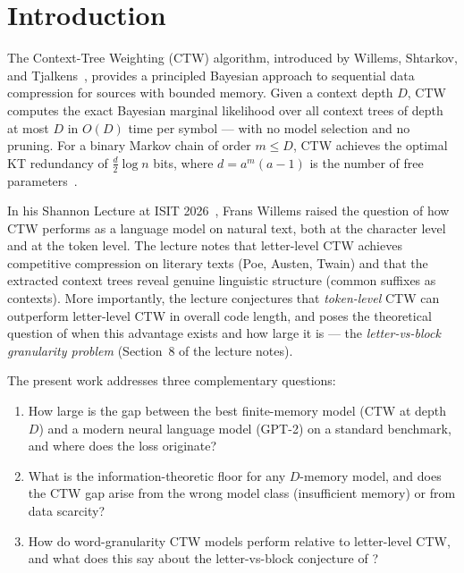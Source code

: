 \documentclass[11pt,a4paper]{article}
\begin{document}
\section{Introduction}
\label{sec:intro}

The Context-Tree Weighting (CTW) algorithm, introduced by
Willems, Shtarkov, and Tjalkens~\citep{WST95},
provides a principled Bayesian approach to sequential data compression
for sources with bounded memory.
Given a context depth $D$, CTW computes the exact Bayesian marginal
likelihood over all context trees of depth at most $D$
in $O(D)$ time per symbol — with no model selection and no pruning.
For a binary Markov chain of order $m \le D$, CTW achieves the optimal
KT redundancy of $\frac{d}{2}\log n$ bits, where $d = a^m(a{-}1)$ is the
number of free parameters~\citep{Ris84}.

In his Shannon Lecture at ISIT 2026~\citep{Willems2026},
Frans Willems raised the question of how CTW performs as a language
model on natural text, both at the character level and at the token level.
The lecture notes that letter-level CTW achieves competitive compression
on literary texts (Poe, Austen, Twain) and that the extracted context
trees reveal genuine linguistic structure (common suffixes as contexts).
More importantly, the lecture conjectures that \emph{token-level} CTW
can outperform letter-level CTW in overall code length, and poses
the theoretical question of when this advantage exists and how large it is —
the \emph{letter-vs-block granularity problem} (Section~8 of the lecture notes).

The present work addresses three complementary questions:
\begin{enumerate}[leftmargin=1.5em]
  \item How large is the gap between the best finite-memory model
        (CTW at depth $D$) and a modern neural language model (GPT-2) on
        a standard benchmark, and where does the loss originate?
  \item What is the information-theoretic floor for any $D$-memory model,
        and does the CTW gap arise from the wrong model class
        (insufficient memory) or from data scarcity?
  \item How do word-granularity CTW models perform relative to letter-level
        CTW, and what does this say about the letter-vs-block conjecture
        of \citet{Willems2026}?
\end{enumerate}
\end{document}
